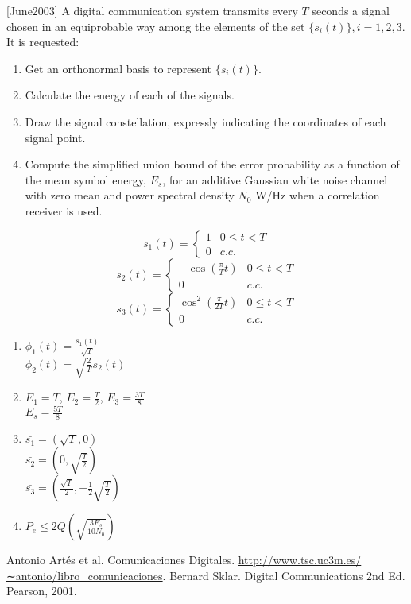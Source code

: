 \documentclass[es,boletin]{uah}
\begin{document}
{
	[June2003] A digital communication system transmits every $T$ seconds a signal chosen in an equiprobable way among the elements of the set $\{s_i(t)\}, i=1,2,3$. It is requested:

\begin{enumerate}
	\item Get an orthonormal basis to represent $\{s_i(t)\}$.
   	\item Calculate the energy of each of the signals.
    \item Draw the signal constellation, expressly indicating the coordinates of each signal point.
    \item Compute the simplified union bound of the error probability as a function of the mean symbol energy, $E_s$, for an additive Gaussian white noise channel with zero mean and power spectral density $N_0$ W/Hz when a correlation receiver is used.
\end{enumerate}

\begin{displaymath}
	s_1(t) = \left \{ \begin{array}{ll} 1 & 0\leq t < T \\ 0 & c.c. \end{array} \right .
\end{displaymath}
\begin{displaymath}
	s_2(t) = \left \{ \begin{array}{ll} -\cos\left ( \frac{\pi}{T}t \right ) & 0\leq t < T \\ 0 & c.c. \end{array} \right .
\end{displaymath}
\begin{displaymath}
	s_3(t) = \left \{ \begin{array}{ll} \cos^2 \left ( \frac{\pi}{2T}t \right ) & 0\leq t < T \\ 0 & c.c. \end{array} \right .
\end{displaymath}

}
{
	\begin{enumerate}
		\item $\phi_1(t) = \frac{s_1(t)}{\sqrt{T}}$ \\
				$\phi_2(t) = \sqrt{\frac{2}{T}}s_2(t)$\\
		\item $E_1=T$, $E_2 = \frac{T}{2}$, $E_3 = \frac{3T}{8}$\\
				$E_s = \frac{5T}{8}$
		\item $\bar{s_1} = (\sqrt{T},0)$ \\
		$\bar{s_2} = (0, \sqrt{\frac{T}{2}})$ \\
		$\bar{s_3} = (\frac{\sqrt{T}}{2},-\frac{1}{2}\sqrt{\frac{T}{2}})$ \\
		\item $P_e \leq 2Q \left ( \sqrt{\frac{3 E_s}{10 N_0}} \right )$
	\end{enumerate}
}


\begin{thebibliography}{100}
	 Antonio Artés et al. Comunicaciones Digitales. \url{http://www.tsc.uc3m.es/∼antonio/libro_comunicaciones}.
	 Bernard Sklar. Digital Communications 2nd Ed. Pearson, 2001.
	\end{thebibliography}
	
	
\end{document}

